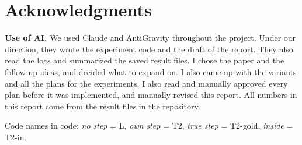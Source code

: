 \documentclass[10pt,letterpaper]{article}
\begin{document}
\section{Acknowledgments}
\textbf{Use of AI.} We used Claude and AntiGravity throughout the project. Under our direction, they wrote the experiment code and the draft of the report. They also read the logs and summarized the saved result files. I chose the paper and the follow-up ideas, and decided what to expand on. I also came up with the variants and all the plans for the experiments.
I also read and manually approved every plan before it was implemented, and manually revised this report.
All numbers in this report come from the result files in the repository.

Code names in code: \emph{no step} = L, \emph{own step} = T2,
\emph{true step} = T2-gold, \emph{inside} = T2-in.

\printbibliography
\end{document}
